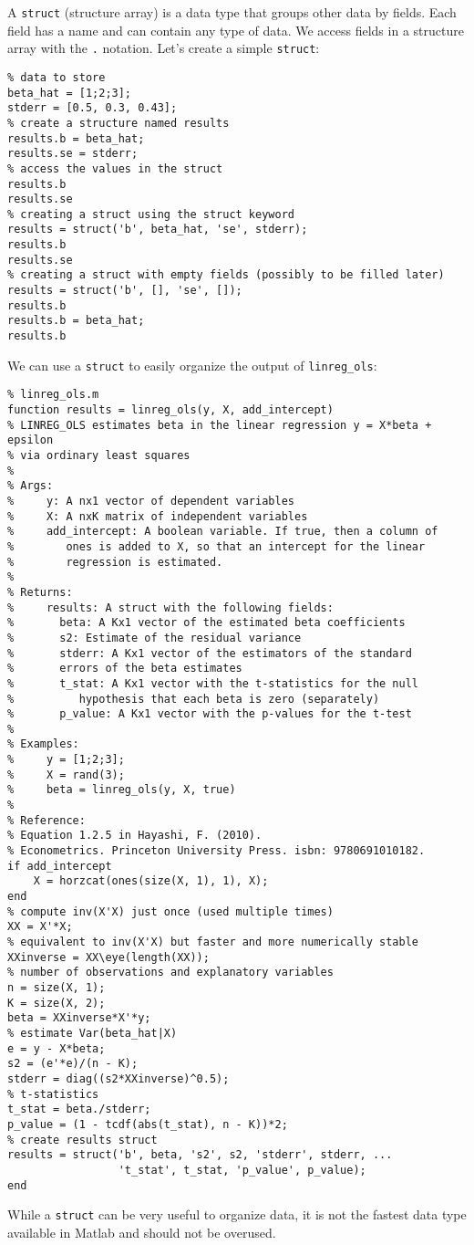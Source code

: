 \documentclass[12pt, a4paper]{article}
\begin{document}
A \texttt{struct} (structure array) is a data type that groups other data by fields.
Each field has a name and can contain any type of data.
We access fields in a structure array with the \texttt{.} notation.
Let's create a simple \texttt{struct}:
\lstset{language=matlab,label= ,caption= ,captionpos=b,firstnumber=1,numbers=left,style=Matlab-editor}
\begin{lstlisting}
% data to store
beta_hat = [1;2;3];
stderr = [0.5, 0.3, 0.43];
% create a structure named results
results.b = beta_hat;
results.se = stderr;
% access the values in the struct
results.b
results.se
% creating a struct using the struct keyword
results = struct('b', beta_hat, 'se', stderr);
results.b
results.se
% creating a struct with empty fields (possibly to be filled later)
results = struct('b', [], 'se', []);
results.b
results.b = beta_hat;
results.b
\end{lstlisting}

We can use a \texttt{struct} to easily organize the output of \texttt{linreg\_ols}:
\lstset{language=matlab,label= ,caption= ,captionpos=b,firstnumber=1,numbers=left,style=Matlab-editor}
\begin{lstlisting}
% linreg_ols.m
function results = linreg_ols(y, X, add_intercept)
% LINREG_OLS estimates beta in the linear regression y = X*beta + epsilon
% via ordinary least squares
%
% Args:
%     y: A nx1 vector of dependent variables
%     X: A nxK matrix of independent variables
%     add_intercept: A boolean variable. If true, then a column of
%        ones is added to X, so that an intercept for the linear
%        regression is estimated.
%
% Returns:
%     results: A struct with the following fields:
%       beta: A Kx1 vector of the estimated beta coefficients
%       s2: Estimate of the residual variance
%       stderr: A Kx1 vector of the estimators of the standard
%       errors of the beta estimates
%       t_stat: A Kx1 vector with the t-statistics for the null
%          hypothesis that each beta is zero (separately)
%       p_value: A Kx1 vector with the p-values for the t-test
%
% Examples:
%     y = [1;2;3];
%     X = rand(3);
%     beta = linreg_ols(y, X, true)
%
% Reference:
% Equation 1.2.5 in Hayashi, F. (2010).
% Econometrics. Princeton University Press. isbn: 9780691010182.
if add_intercept
    X = horzcat(ones(size(X, 1), 1), X);
end
% compute inv(X'X) just once (used multiple times)
XX = X'*X;
% equivalent to inv(X'X) but faster and more numerically stable
XXinverse = XX\eye(length(XX));
% number of observations and explanatory variables
n = size(X, 1);
K = size(X, 2);
beta = XXinverse*X'*y;
% estimate Var(beta_hat|X)
e = y - X*beta;
s2 = (e'*e)/(n - K);
stderr = diag((s2*XXinverse)^0.5);
% t-statistics
t_stat = beta./stderr;
p_value = (1 - tcdf(abs(t_stat), n - K))*2;
% create results struct
results = struct('b', beta, 's2', s2, 'stderr', stderr, ...
                 't_stat', t_stat, 'p_value', p_value);
end
\end{lstlisting}
While a \texttt{struct} can be very useful to organize data, it is not the fastest data type available in Matlab and should not be overused.
\end{document}
